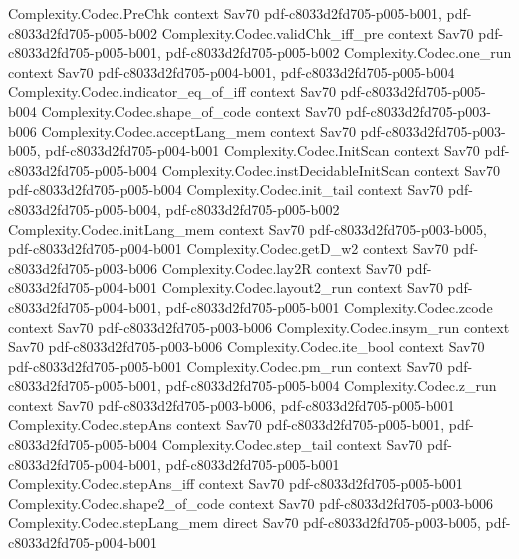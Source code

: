 \begin{theorem}
\proofstep
  {Complexity.Codec.PreChk}
  {context}
  {Sav70}
  {pdf-c8033d2fd705-p005-b001,
    pdf-c8033d2fd705-p005-b002}
\proofstep
  {Complexity.Codec.validChk_iff_pre}
  {context}
  {Sav70}
  {pdf-c8033d2fd705-p005-b001,
    pdf-c8033d2fd705-p005-b002}
\proofstep
  {Complexity.Codec.one_run}
  {context}
  {Sav70}
  {pdf-c8033d2fd705-p004-b001,
    pdf-c8033d2fd705-p005-b004}
\proofstep
  {Complexity.Codec.indicator_eq_of_iff}
  {context}
  {Sav70}
  {pdf-c8033d2fd705-p005-b004}
\proofstep
  {Complexity.Codec.shape_of_code}
  {context}
  {Sav70}
  {pdf-c8033d2fd705-p003-b006}
\proofstep
  {Complexity.Codec.acceptLang_mem}
  {context}
  {Sav70}
  {pdf-c8033d2fd705-p003-b005,
    pdf-c8033d2fd705-p004-b001}
\proofstep
  {Complexity.Codec.InitScan}
  {context}
  {Sav70}
  {pdf-c8033d2fd705-p005-b004}
\proofstep
  {Complexity.Codec.instDecidableInitScan}
  {context}
  {Sav70}
  {pdf-c8033d2fd705-p005-b004}
\proofstep
  {Complexity.Codec.init_tail}
  {context}
  {Sav70}
  {pdf-c8033d2fd705-p005-b004,
    pdf-c8033d2fd705-p005-b002}
\proofstep
  {Complexity.Codec.initLang_mem}
  {context}
  {Sav70}
  {pdf-c8033d2fd705-p003-b005,
    pdf-c8033d2fd705-p004-b001}
\proofstep
  {Complexity.Codec.getD_w2}
  {context}
  {Sav70}
  {pdf-c8033d2fd705-p003-b006}
\proofstep
  {Complexity.Codec.lay2R}
  {context}
  {Sav70}
  {pdf-c8033d2fd705-p004-b001}
\proofstep
  {Complexity.Codec.layout2_run}
  {context}
  {Sav70}
  {pdf-c8033d2fd705-p004-b001,
    pdf-c8033d2fd705-p005-b001}
\proofstep
  {Complexity.Codec.zcode}
  {context}
  {Sav70}
  {pdf-c8033d2fd705-p003-b006}
\proofstep
  {Complexity.Codec.insym_run}
  {context}
  {Sav70}
  {pdf-c8033d2fd705-p003-b006}
\proofstep
  {Complexity.Codec.ite_bool}
  {context}
  {Sav70}
  {pdf-c8033d2fd705-p005-b001}
\proofstep
  {Complexity.Codec.pm_run}
  {context}
  {Sav70}
  {pdf-c8033d2fd705-p005-b001,
    pdf-c8033d2fd705-p005-b004}
\proofstep
  {Complexity.Codec.z_run}
  {context}
  {Sav70}
  {pdf-c8033d2fd705-p003-b006,
    pdf-c8033d2fd705-p005-b001}
\proofstep
  {Complexity.Codec.stepAns}
  {context}
  {Sav70}
  {pdf-c8033d2fd705-p005-b001,
    pdf-c8033d2fd705-p005-b004}
\proofstep
  {Complexity.Codec.step_tail}
  {context}
  {Sav70}
  {pdf-c8033d2fd705-p004-b001,
    pdf-c8033d2fd705-p005-b001}
\proofstep
  {Complexity.Codec.stepAns_iff}
  {context}
  {Sav70}
  {pdf-c8033d2fd705-p005-b001}
\proofstep
  {Complexity.Codec.shape2_of_code}
  {context}
  {Sav70}
  {pdf-c8033d2fd705-p003-b006}
\proofstep
  {Complexity.Codec.stepLang_mem}
  {direct}
  {Sav70}
  {pdf-c8033d2fd705-p003-b005,
    pdf-c8033d2fd705-p004-b001}
\proofstep

\end{theorem}
